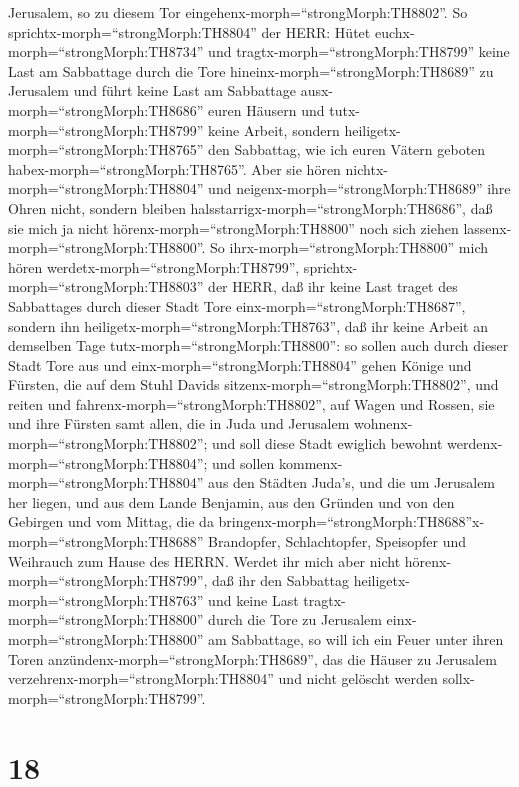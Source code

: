 Jerusalem, so zu diesem Tor eingehenx-morph=``strongMorph:TH8802''.
 So sprichtx-morph=``strongMorph:TH8804'' der HERR: Hütet
euchx-morph=``strongMorph:TH8734'' und
tragtx-morph=``strongMorph:TH8799'' keine Last am Sabbattage durch die
Tore hineinx-morph=``strongMorph:TH8689'' zu Jerusalem  und
führt keine Last am Sabbattage ausx-morph=``strongMorph:TH8686'' euren
Häusern und tutx-morph=``strongMorph:TH8799'' keine Arbeit, sondern
heiligetx-morph=``strongMorph:TH8765'' den Sabbattag, wie ich euren
Vätern geboten habex-morph=``strongMorph:TH8765''.  Aber
sie hören nichtx-morph=``strongMorph:TH8804'' und
neigenx-morph=``strongMorph:TH8689'' ihre Ohren nicht, sondern bleiben
halsstarrigx-morph=``strongMorph:TH8686'', daß sie mich ja nicht
hörenx-morph=``strongMorph:TH8800'' noch sich ziehen
lassenx-morph=``strongMorph:TH8800''.  So
ihrx-morph=``strongMorph:TH8800'' mich hören
werdetx-morph=``strongMorph:TH8799'',
sprichtx-morph=``strongMorph:TH8803'' der HERR, daß ihr keine Last
traget des Sabbattages durch dieser Stadt Tore
einx-morph=``strongMorph:TH8687'', sondern ihn
heiligetx-morph=``strongMorph:TH8763'', daß ihr keine Arbeit an
demselben Tage tutx-morph=``strongMorph:TH8800'':  so
sollen auch durch dieser Stadt Tore aus und
einx-morph=``strongMorph:TH8804'' gehen Könige und Fürsten, die auf dem
Stuhl Davids sitzenx-morph=``strongMorph:TH8802'', und reiten und
fahrenx-morph=``strongMorph:TH8802'', auf Wagen und Rossen, sie und ihre
Fürsten samt allen, die in Juda und Jerusalem
wohnenx-morph=``strongMorph:TH8802''; und soll diese Stadt ewiglich
bewohnt werdenx-morph=``strongMorph:TH8804'';  und sollen
kommenx-morph=``strongMorph:TH8804'' aus den Städten Juda's, und die um
Jerusalem her liegen, und aus dem Lande Benjamin, aus den Gründen und
von den Gebirgen und vom Mittag, die da
bringenx-morph=``strongMorph:TH8688''x-morph=``strongMorph:TH8688''
Brandopfer, Schlachtopfer, Speisopfer und Weihrauch zum Hause des HERRN.
 Werdet ihr mich aber nicht
hörenx-morph=``strongMorph:TH8799'', daß ihr den Sabbattag
heiligetx-morph=``strongMorph:TH8763'' und keine Last
tragtx-morph=``strongMorph:TH8800'' durch die Tore zu Jerusalem
einx-morph=``strongMorph:TH8800'' am Sabbattage, so will ich ein Feuer
unter ihren Toren anzündenx-morph=``strongMorph:TH8689'', das die Häuser
zu Jerusalem verzehrenx-morph=``strongMorph:TH8804'' und nicht gelöscht
werden sollx-morph=``strongMorph:TH8799''.

\hypertarget{section-17}{%
\section{18}\label{section-17}}

